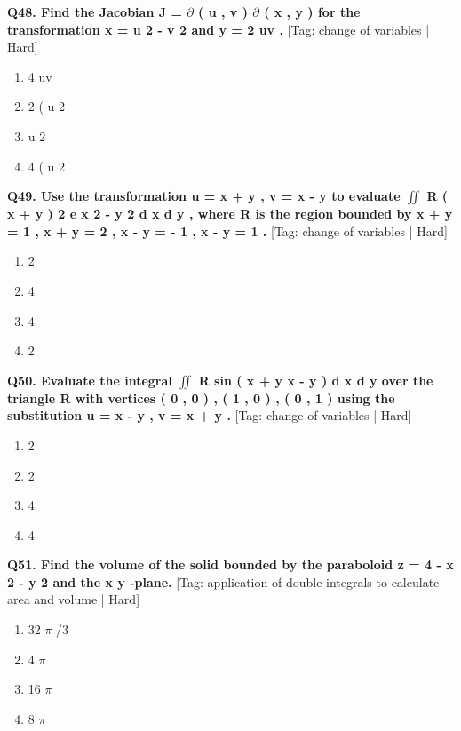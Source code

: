 \noindent\textbf{Q48. Find the Jacobian J = $\partial$ ( u , v ) $\partial$ ( x , y ) for the transformation x = u 2 - v 2 and y = 2 uv .} \hfill [Tag: change of variables | Hard]
\begin{enumerate}[label=(\alph*),topsep=2pt,itemsep=1pt,partopsep=0pt,parsep=0pt]
    \item {{4 uv}}
    \item {{2 ( u 2}}
    \item {{u 2}}
    \item {{4 ( u 2}}
\end{enumerate}
\vspace{2mm}

\noindent\textbf{Q49. Use the transformation u = x + y , v = x - y to evaluate $\iint$ R ( x + y ) 2 e x 2 - y 2 d x d y , where R is the region bounded by x + y = 1 , x + y = 2 , x - y = - 1 , x - y = 1 .} \hfill [Tag: change of variables | Hard]
\begin{enumerate}[label=(\alph*),topsep=2pt,itemsep=1pt,partopsep=0pt,parsep=0pt]
    \item {{2}}
    \item {{4}}
    \item {{4}}
    \item {{2}}
\end{enumerate}
\vspace{2mm}

\noindent\textbf{Q50. Evaluate the integral $\iint$ R sin ( x + y x - y ) d x d y over the triangle R with vertices ( 0 , 0 ) , ( 1 , 0 ) , ( 0 , 1 ) using the substitution u = x - y , v = x + y .} \hfill [Tag: change of variables | Hard]
\begin{enumerate}[label=(\alph*),topsep=2pt,itemsep=1pt,partopsep=0pt,parsep=0pt]
    \item {{2}}
    \item {{2}}
    \item {{4}}
    \item {{4}}
\end{enumerate}
\vspace{2mm}

\noindent\textbf{Q51. Find the volume of the solid bounded by the paraboloid z = 4 - x 2 - y 2 and the x y -plane.} \hfill [Tag: application of double integrals to calculate area and volume | Hard]
\begin{enumerate}[label=(\alph*),topsep=2pt,itemsep=1pt,partopsep=0pt,parsep=0pt]
    \item {{32 $\pi$ /3}}
    \item {{4 $\pi$}}
    \item {{16 $\pi$}}
    \item {{8 $\pi$}}
\end{enumerate}
\vspace{2mm}

